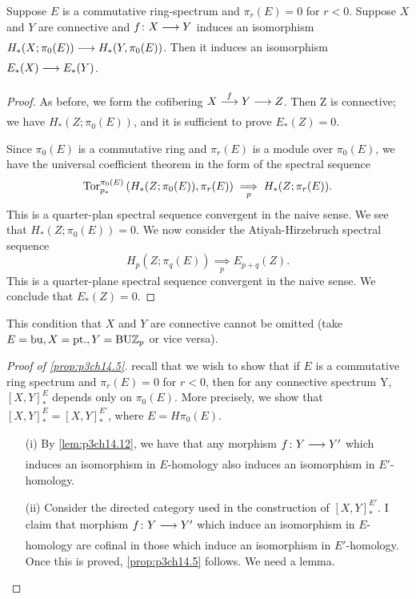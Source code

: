 \documentclass[../main]{subfiles}
\begin{document}
\begin{lemma} \label{lem:p3ch14.13}
Suppose $E$ is a commutative ring-spectrum and $ \pi_{r}(E)=0$ for $r<0$. Suppose $X$ and $Y$ are connective and $f\colon  X \lar{}  Y $ induces an isomorphism $H_{\ast}(X;\pi_{0}(E)) \lar{} H_{\ast}(Y, \pi_{0}(E))$. Then it induces an isomorphism $E_{\ast}(X) \lar{} E_{\ast}(Y)$.

\begin{proof} 
  As before, we form the cofibering $X \vra{f} Y \lar{} Z$. Then Z is connective; we have $H_{\ast}(Z;\pi_{0}(E))$, and it is sufficient to prove $E_{\ast}(Z)=0$.

  Since $ \pi_{0}(E)$ is a commutative ring and $ \pi_{r}(E)$ is a module over $ \pi_{0}(E)$, we have the universal coefficient theorem in the form of the spectral sequence
  \[
  \mathrm{Tor}_{p_{\ast}}^{\pi_{0}(E)} \left( H_{\ast}(Z;\pi_{0}(E)), \pi_{r}(E)\right) \underset{p}{\implies} H_{\ast}(Z;\pi_{r}(E)). 
  \] 
  This is a quarter-plan spectral sequence convergent in the naive sense. We see that $H_{\ast}(Z;\pi_{0}(E))=0$. We now consider the Atiyah-Hirzebruch spectral sequence
  \[
    H_{p}(Z;\pi_{q}(E)) \underset{p}{\implies} E_{p+q} (Z). 
  \] 
  This is a quarter-plane spectral sequence convergent in the naive sense. We conclude that $E_{\ast}(Z)=0$.
\end{proof}
\begin{warning}
This condition that $X$ and $Y$ are connective cannot be omitted (take $E = \mathrm{bu}, X=\mathrm{pt.}, Y=\mathrm{BU}\mathbb{Z}_p$ or vice versa).
\end{warning} 
\end{lemma}

\begin{proof}[Proof of \ref{prop:p3ch14.5}] 
  recall that we wish to show that if $E$ is a commutative ring spectrum and $\pi_{r}(E)=0$ for $r<0$, then for any connective spectrum Y, $\left[X,Y\right]^E_{\ast}$ depends only on  $\pi_{0}(E)$. More precisely, we show that $\left[X,Y\right]^E_{\ast}=\left[X,Y\right]^{E'}_{\ast}$, where $E= H \pi_{0}(E)$.
  \begin{enumerate} 
    \item [(i)] By \ref{lem:p3ch14.12}, we have that any morphism $f\colon  Y \lar{}  Y' $ which induces an isomorphism in $E$-homology also induces an isomorphism in $E'$-homology.
    \item [(ii)] Consider the directed category used in the construction of $\left[X,Y\right]^{E'}_{\ast}$. I claim that morphism $f\colon  Y \lar{}  Y' $ which induce an isomorphism in $E$-homology are cofinal in those which induce an isomorphism in $E'$-homology. Once this is proved, \ref{prop:p3ch14.5} follows. We need a lemma.
  \end{enumerate}
\end{proof}
\end{document}
